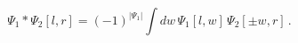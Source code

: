 \begin{equation}
\Psi _{1}\ast \Psi _{2}[l,r]=(-1)^{|\Psi _{1}|}\int dw\,\Psi _{1}[l,w]\,\Psi
_{2}[\pm w,r]\,.  \label{eq:anti-star}
\end{equation}

